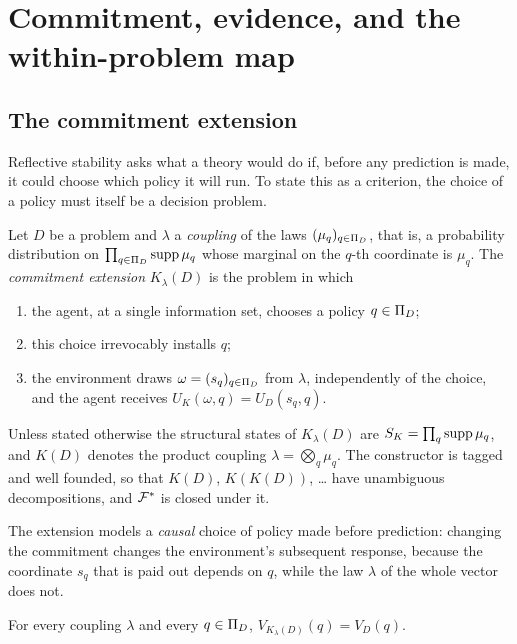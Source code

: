 \section{Commitment, evidence, and the within-problem map}\label{sec:commit}

\subsection{The commitment extension}

Reflective stability asks what a theory would do if, before any prediction is made, it could choose
which policy it will run. To state this as a criterion, the choice of a policy must itself be a
decision problem.

\begin{definition}\label{def:commit}
Let $D$ be a problem and $\lambda$ a \emph{coupling} of the laws $(\mu_q)_{q\in\Pi_D}$, that is, a
probability distribution on $\prod_{q\in\Pi_D}\operatorname{supp}\mu_q$ whose marginal on the $q$-th coordinate is
$\mu_q$. The \emph{commitment extension} $K_\lambda(D)$ is the problem in which
\begin{enumerate}[label=(\roman*)]
  \item the agent, at a single information set, chooses a policy $q\in\Pi_D$;
  \item this choice irrevocably installs $q$;
  \item the environment draws $\omega=(s_q)_{q\in\Pi_D}$ from $\lambda$, independently of the choice, and
        the agent receives $U_{K}(\omega,q)=U_D(s_q,q)$.
\end{enumerate}
Unless stated otherwise the structural states of $K_\lambda(D)$ are
$S_{K}=\prod_{q}\operatorname{supp}\mu_q$, and $K(D)$ denotes the product coupling
$\lambda=\bigotimes_q\mu_q$. The constructor is tagged and well founded, so that $K(D)$,
$K(K(D))$, \dots{} have unambiguous decompositions, and $\mathcal{F}^*$ is closed under it.
\end{definition}

The extension models a \emph{causal} choice of policy made before prediction: changing the
commitment changes the environment's subsequent response, because the coordinate $s_q$ that is
paid out depends on $q$, while the law $\lambda$ of the whole vector does not.

\begin{proposition}\label{prop:commitvalue}
For every coupling $\lambda$ and every $q\in\Pi_D$, $V_{K_\lambda(D)}(q)=V_D(q)$.
\end{proposition}

